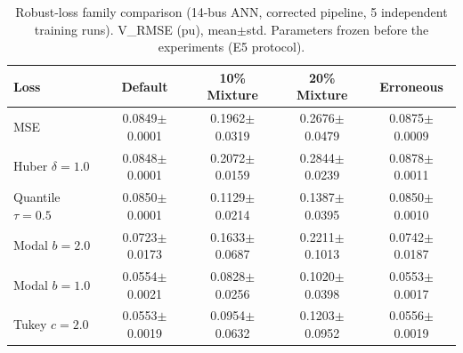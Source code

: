 \begin{table}[htbp]
\centering
\caption{Robust-loss family comparison (14-bus ANN, corrected pipeline, 5 independent training runs). V\_RMSE (pu), mean$\pm$std. Parameters frozen before the experiments (E5 protocol).}
\label{tab:robustloss}
\footnotesize
\begin{tabular}{lcccc}
\toprule
Loss & Default & 10\% Mixture & 20\% Mixture & Erroneous \\
\midrule
MSE & 0.0849$\pm$0.0001 & 0.1962$\pm$0.0319 & 0.2676$\pm$0.0479 & 0.0875$\pm$0.0009 \\
Huber $\delta{=}1.0$ & 0.0848$\pm$0.0001 & 0.2072$\pm$0.0159 & 0.2844$\pm$0.0239 & 0.0878$\pm$0.0011 \\
Quantile $\tau{=}0.5$ & 0.0850$\pm$0.0001 & 0.1129$\pm$0.0214 & 0.1387$\pm$0.0395 & 0.0850$\pm$0.0010 \\
Modal $b{=}2.0$ & 0.0723$\pm$0.0173 & 0.1633$\pm$0.0687 & 0.2211$\pm$0.1013 & 0.0742$\pm$0.0187 \\
Modal $b{=}1.0$ & 0.0554$\pm$0.0021 & 0.0828$\pm$0.0256 & 0.1020$\pm$0.0398 & 0.0553$\pm$0.0017 \\
Tukey $c{=}2.0$ & 0.0553$\pm$0.0019 & 0.0954$\pm$0.0632 & 0.1203$\pm$0.0952 & 0.0556$\pm$0.0019 \\
\bottomrule
\end{tabular}
\end{table}
